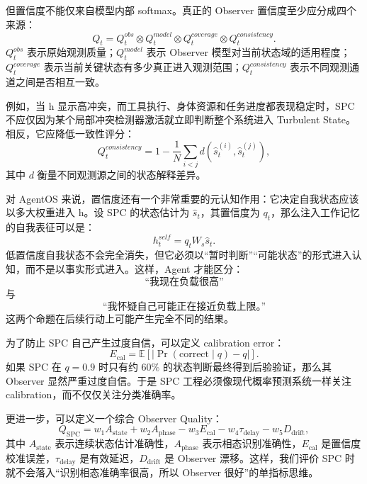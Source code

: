 但置信度不能仅来自模型内部 softmax。真正的 Observer 置信度至少应分成四个来源：
\begin{equation}
Q_t
=
Q_t^{obs}
\otimes
Q_t^{model}
\otimes
Q_t^{coverage}
\otimes
Q_t^{consistency}.
\end{equation}
$Q_t^{obs}$ 表示原始观测质量；$Q_t^{model}$ 表示 Observer 模型对当前状态域的适用程度；$Q_t^{coverage}$ 表示当前关键状态有多少真正进入观测范围；$Q_t^{consistency}$ 表示不同观测通道之间是否相互一致。

例如，当 h 显示高冲突，而工具执行、身体资源和任务进度都表现稳定时，SPC 不应仅因为某个局部冲突检测器激活就立即判断整个系统进入 Turbulent State。相反，它应降低一致性评分：
\begin{equation}
Q_t^{consistency}
=
1-
\frac{1}{N}
\sum_{i<j}
d
\left(
\hat s_t^{(i)},
\hat s_t^{(j)}
\right),
\end{equation}
其中 $d$ 衡量不同观测源之间的状态解释差异。

对 AgentOS 来说，置信度还有一个非常重要的元认知作用：它决定自我状态应该以多大权重进入 h。设 SPC 的状态估计为 $\hat s_t$，其置信度为 $q_t$，那么注入工作记忆的自我表征可以是：
\begin{equation}
h_t^{self}
=
q_t
W_s \hat s_t.
\end{equation}
低置信度自我状态不会完全消失，但它必须以“暂时判断”“可能状态”的形式进入认知，而不是以事实形式进入。这样，Agent 才能区分：
\begin{equation}
\text{“我现在负载很高”}
\end{equation}
与
\begin{equation}
\text{“我怀疑自己可能正在接近负载上限。”}
\end{equation}
这两个命题在后续行动上可能产生完全不同的结果。

为了防止 SPC 自己产生过度自信，可以定义 calibration error：
\begin{equation}
E_{\mathrm{cal}}
=
\mathbb E
\left[
\left|
\Pr(\mathrm{correct}\mid q)
-
q
\right|
\right].
\end{equation}
如果 SPC 在 $q=0.9$ 时只有约 $60\%$ 的状态判断最终得到后验验证，那么其 Observer 显然严重过度自信。于是 SPC 工程必须像现代概率预测系统一样关注 calibration，而不仅仅关注分类准确率。

更进一步，可以定义一个综合 Observer Quality：
\begin{equation}
Q_{\mathrm{SPC}}
=
w_1 A_{\mathrm{state}}
+
w_2 A_{\mathrm{phase}}
-
w_3 E_{\mathrm{cal}}
-
w_4 \tau_{\mathrm{delay}}
-
w_5 D_{\mathrm{drift}},
\end{equation}
其中 $A_{\mathrm{state}}$ 表示连续状态估计准确性，$A_{\mathrm{phase}}$ 表示相态识别准确性，$E_{\mathrm{cal}}$ 是置信度校准误差，$\tau_{\mathrm{delay}}$ 是有效延迟，$D_{\mathrm{drift}}$ 是 Observer 漂移。这样，我们评价 SPC 时就不会落入“识别相态准确率很高，所以 Observer 很好”的单指标思维。

